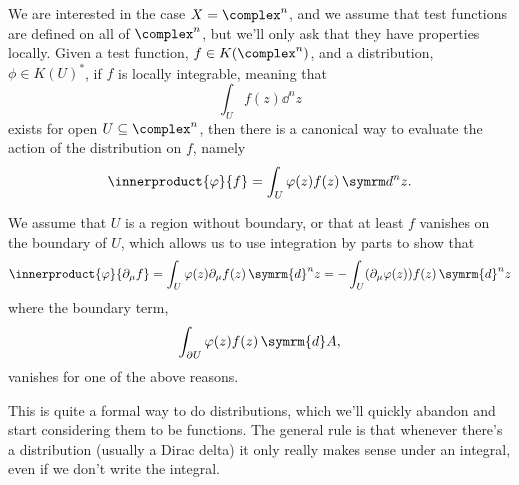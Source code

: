 \documentclass[fleqn]{NotesClass}
\renewcommand{\dd}[1]{\,\symrm{d}#1}
\begin{document}
    We are interested in the case \(X = \complex^n\), and we assume that test functions are defined on all of \(\complex^n\), but we'll only ask that they have properties locally.
    Given a test function, \(f \in K(\complex^n)\), and a distribution, \(\phi \in K(U)^*\), if \(f\) is locally integrable, meaning that
    \begin{equation}
        \int_U f(z) \dd^nz
    \end{equation}
    exists for open \(U \subseteq \complex^n\), then there is a canonical way to evaluate the action of the distribution on \(f\), namely
    \begin{equation}
        \innerproduct{\varphi}{f} = \int_U \varphi(z) f(z) \dd^nz.
    \end{equation}
    
    We assume that \(U\) is a region without boundary, or that at least \(f\) vanishes on the boundary of \(U\), which allows us to use integration by parts to show that
    \begin{equation}
        \innerproduct{\varphi}{\partial_\mu f} = \int_U \varphi(z) \partial_\mu f(z) \dd{^nz} = -\int_U (\partial_\mu \varphi(z)) f(z) \dd{^nz}
    \end{equation}
    where the boundary term,
    \begin{equation}
        \int_{\partial U} \varphi(z)f(z) \dd{A},
    \end{equation}
    vanishes for one of the above reasons.
    
    This is quite a formal way to do distributions, which we'll quickly abandon and start considering them to be functions.
    The general rule is that whenever there's a distribution (usually a Dirac delta) it only really makes sense under an integral, even if we don't write the integral.
    
    
    
\end{document}
